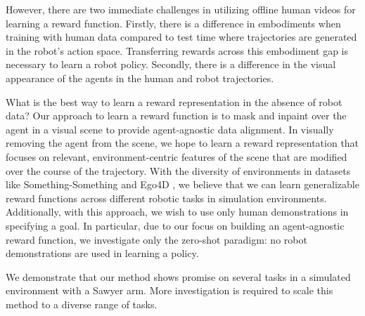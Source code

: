 However, there are two immediate challenges in utilizing offline human videos for learning a reward function. Firstly, there is a difference in embodiments when training with human data compared to test time where trajectories are generated in the robot's action space. Transferring rewards across this embodiment gap is necessary to learn a robot policy. Secondly, there is a  difference in the visual appearance of the agents in the human and robot trajectories. 

What is the best way to learn a reward representation in the absence of robot data? Our approach to learn a reward function is to mask and inpaint over the agent in a visual scene to provide agent-agnostic data alignment. In visually removing the agent from the scene, we hope to learn a reward representation that focuses on relevant, environment-centric features of the scene that are modified over the course of the trajectory. With the diversity of environments in datasets like Something-Something \cite{smthsmth} and Ego4D \cite{ego4d}, we believe that we can learn generalizable reward functions across different robotic tasks in simulation environments. Additionally, with this approach, we wish to use only human demonstrations in specifying a goal. In particular, due to our focus on building an agent-agnostic reward function, we investigate only the zero-shot paradigm: no robot demonstrations are used in learning a policy.

We demonstrate that our method shows promise on several tasks in a simulated environment with a Sawyer arm. More investigation is required to scale this method to a diverse range of tasks.